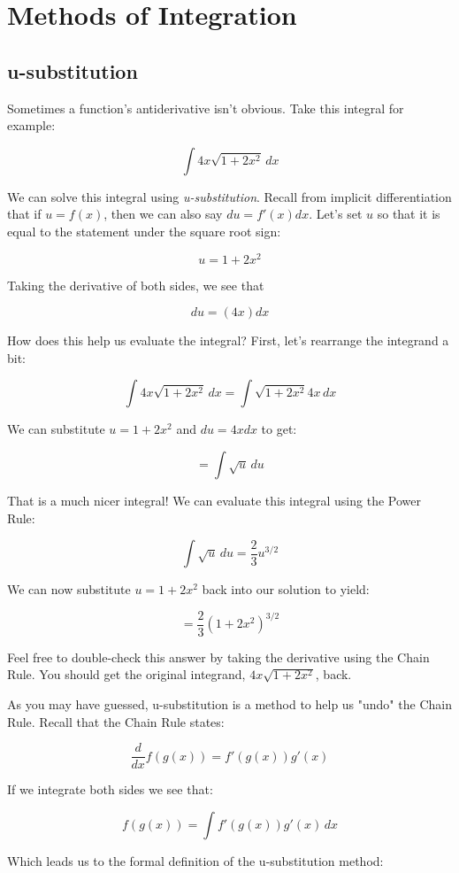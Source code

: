 \chapter{Methods of Integration}

\section{u-substitution}
Sometimes a function's antiderivative isn't obvious. Take this 
integral for example: 

$$\int 4x \sqrt{1 + 2x^2}\, dx$$

We can solve this integral using \textit{u-substitution}. 
Recall from implicit differentiation that if $u = f(x)$, then we can also say 
$du = f'(x) dx$. Let's set $u$ so that it is equal to the statement under the 
square root sign: 

$$u = 1 + 2x^2$$

Taking the derivative of both sides, we see that 

$$du = (4x) dx$$ 

How does this help us evaluate the integral? First, let's rearrange the 
integrand a bit: 

$$\int 4x \sqrt{1 + 2x^2}\,dx = \int \sqrt{1 + 2x^2} 4x\,dx$$

We can substitute $u = 1 + 2x^2$ and $du = 4x dx$ to get: 

$$= \int \sqrt{u}\,du$$

That is a much nicer integral! We can evaluate this integral using the Power 
Rule: 

$$\int \sqrt{u}\,du = \frac{2}{3}u^{3/2}$$

We can now substitute $u = 1 + 2x^2$ back into our solution to yield: 

$$= \frac{2}{3}(1 + 2x^2)^{3/2}$$

Feel free to double-check this answer by taking the derivative using the 
Chain Rule. You should get the original integrand, $4x \sqrt{1 + 2x^2}$, back. 

As you may have guessed, u-substitution is a method to help us "undo" the 
Chain Rule. Recall that the Chain Rule states: 

$$\frac{d}{dx}f(g(x)) = f'(g(x))g'(x)$$

If we integrate both sides we see that: 

$$f(g(x)) = \int f'(g(x))g'(x)\,dx$$ 

Which leads us to the formal definition of the u-substitution method:

